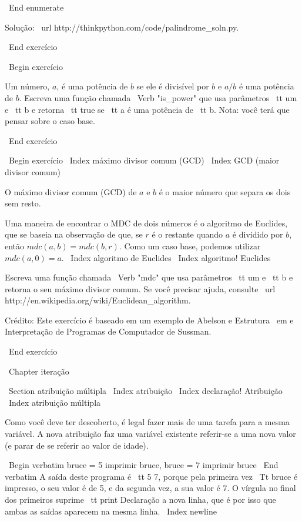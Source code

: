 \documentclass[10pt]{book}
\begin{document}
\begin {itemize}
{{{{\ End {enumerate}

Solução: \ url {http://thinkpython.com/code/palindrome_soln.py}.

\ End {} exercício

\ Begin {} exercício

Um número, $ a $, é uma potência de $ b $ se ele é divisível por $ b $
e $ a / b $ é uma potência de $ b $. Escreva uma função chamada
\ Verb "is_power" que usa parâmetros {\ tt um} e {\ tt b}
e retorna {\ tt true} se {\ tt a} é uma potência de {\ tt b}.
Nota: você terá que pensar sobre o caso base.

\ End {} exercício


\ Begin {} exercício
\ Index {máximo divisor comum (GCD)}
\ Index {GCD (maior divisor comum)}

O máximo divisor comum (GCD) de $ a $ e $ b $ é o maior número
que separa os dois sem resto.  

Uma maneira de encontrar o MDC de dois números é o algoritmo de Euclides,
que se baseia na observação de que, se $ r $ é o restante
quando $ a $ é dividido por $ b $, então $ mdc (a, b) = mdc (b, r) $.
Como um caso base, podemos utilizar $ mdc (a, 0) = a $.
\ Index {algoritmo de Euclides}
\ Index {algoritmo! Euclides}

Escreva uma função chamada
\ Verb "mdc" que usa parâmetros {\ tt um} e {\ tt b}
e retorna o seu máximo divisor comum. Se você precisar
ajuda, consulte \ url {http://en.wikipedia.org/wiki/Euclidean_algorithm}.

Crédito: Este exercício é baseado em um exemplo de Abelson e
{Estrutura \ em e Interpretação de Programas de Computador} de Sussman.

\ End {} exercício


\ Chapter {iteração}

\ Section {atribuição múltipla}
\ Index {atribuição}
\ Index {declaração! Atribuição}
\ Index {atribuição múltipla}

Como você deve ter descoberto, é legal
fazer mais de uma tarefa para a mesma variável. A
nova atribuição faz uma variável existente referir-se a uma nova
valor (e parar de se referir ao valor de idade).

\ Begin {verbatim}
bruce = 5
imprimir bruce,
bruce = 7
imprimir bruce
\ End {verbatim}
%
A saída deste programa é {\ tt 5 7}, porque pela primeira vez
{\ Tt bruce} é impresso, o seu valor é de 5, e da segunda vez, a sua
valor é 7. O
vírgula no final dos primeiros suprime {\ tt print} Declaração
a nova linha, que é por isso que ambas as saídas
aparecem na mesma linha.
\ Index {newline}

}}}}
\end{itemize}
\end{document}
